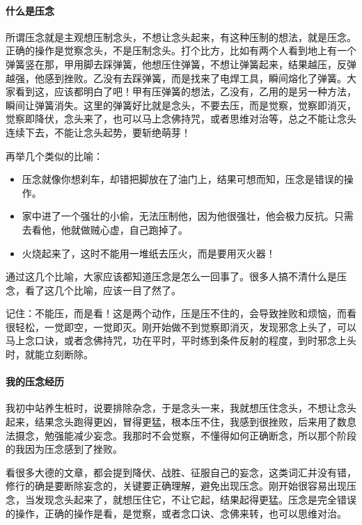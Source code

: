 \paragraph{什么是压念}

所谓压念就是主观想压制念头，不想让念头起来，有这种压制的想法，就是压念。正确的操作是觉察念头，不是压制念头。打个比方，比如有两个人看到地上有一个弹簧竖在那，甲用脚去踩弹簧，他想压住弹簧，不想让弹簧起来，结果越压，反弹越强，他感到挫败。乙没有去踩弹簧，而是找来了电焊工具，瞬间熔化了弹簧。大家看到这，应该都明白了吧！甲有压弹簧的想法，乙没有，乙用的是另一种方法，瞬间让弹簧消失。这里的弹簧好比就是念头，不要去压，而是觉察，觉察即消灭，觉察即降伏，念头来了，也可以马上念佛持咒，或者思维对治等，总之不能让念头连续下去，不能让念头起势，要斩绝萌芽！

再举几个类似的比喻：\begin{itemize}
    \item 压念就像你想刹车，却错把脚放在了油门上，结果可想而知，压念是错误的操作。
    \item 家中进了一个强壮的小偷，无法压制他，因为他很强壮，他会极力反抗。只需去看他，他就做贼心虚，自己跑掉了。
    \item 火烧起来了，这时不能用一堆纸去压火，而是要用灭火器！
\end{itemize}

通过这几个比喻，大家应该都知道压念是怎么一回事了。很多人搞不清什么是压念，看了这几个比喻，应该一目了然了。

记住：不能压，而是看！这是两个动作，压是压不住的，会导致挫败和烦恼，而看很轻松，一觉即空，一觉即灭。刚开始做不到觉察即消灭，发现邪念上头了，可以马上念口诀，或者念佛持咒，功在平时，平时练到条件反射的程度，到时邪念上头时，就能立刻断除。

\paragraph{我的压念经历}

我初中站养生桩时，说要排除杂念，于是念头一来，我就想压住念头，不想让念头起来，结果念头跑得更凶，冒得更猛，根本压不住，我感到很挫败，后来用了数息法摄念，勉强能减少妄念。我那时不会觉察，不懂得如何正确断念，所以那个阶段的我因为压念感到了挫败。

看很多大德的文章，都会提到降伏、战胜、征服自己的妄念，这类词汇并没有错，修行的确是要断除妄念的，关键要正确理解，避免出现压念。刚开始很容易出现压念，当发现念头起来了，就想压住它，不让它起，结果起得更猛。压念是完全错误的操作，正确的操作是看，是觉察，或者念口诀、念佛来转，也可以思维对治。

